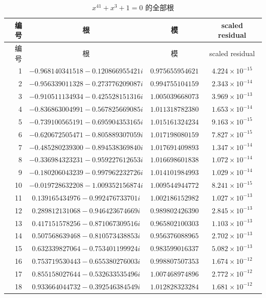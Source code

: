 \documentclass[a4paper,11pt]{article}
\begin{document}
\begin{longtable}{rccc}
\caption{$x^{41}+x^3+1=0$ 的全部根}\label{tab:p202-roots}\\
\toprule
编号 & 根 & 模 & scaled residual \\
\midrule
\endfirsthead
\toprule
编号 & 根 & 模 & scaled residual \\
\midrule
\endhead
1 & $-0.968140341518-0.120866955421i$ & $0.975655954621$ & $4.224\times10^{-15}$ \\
2 & $-0.956339011328-0.273776209087i$ & $0.994755104159$ & $2.343\times10^{-14}$ \\
3 & $-0.910511134934-0.425528151316i$ & $1.005039668073$ & $3.969\times10^{-13}$ \\
4 & $-0.836863004991-0.567825669085i$ & $1.011318782380$ & $1.653\times10^{-14}$ \\
5 & $-0.739100565191-0.695904353165i$ & $1.015161324234$ & $9.163\times10^{-15}$ \\
6 & $-0.620672505471-0.805889307059i$ & $1.017198080159$ & $7.827\times10^{-15}$ \\
7 & $-0.485280239300-0.894538369840i$ & $1.017691409893$ & $1.347\times10^{-14}$ \\
8 & $-0.336984323231-0.959227612653i$ & $1.016698601838$ & $1.072\times10^{-14}$ \\
9 & $-0.180206043239-0.997962232726i$ & $1.014101984993$ & $1.029\times10^{-14}$ \\
10 & $-0.019728632208-1.009352156874i$ & $1.009544944772$ & $8.241\times10^{-15}$ \\
11 & $0.139165434976-0.992476733701i$ & $1.002186152982$ & $1.027\times10^{-13}$ \\
12 & $0.289812131068-0.946423674669i$ & $0.989802426390$ & $2.845\times10^{-13}$ \\
13 & $0.417151578256-0.871067309516i$ & $0.965802100303$ & $1.103\times10^{-13}$ \\
14 & $0.507568639468-0.810573438853i$ & $0.956376088965$ & $2.702\times10^{-13}$ \\
15 & $0.632339827064-0.753401199924i$ & $0.983599016337$ & $5.082\times10^{-13}$ \\
16 & $0.753719530443-0.655380276003i$ & $0.998807507353$ & $1.674\times10^{-12}$ \\
17 & $0.855158027644-0.532633535496i$ & $1.007468974896$ & $2.772\times10^{-12}$ \\
18 & $0.933664044732-0.392546384549i$ & $1.012828323284$ & $1.681\times10^{-12}$ \\

\end{longtable}
\end{document}
